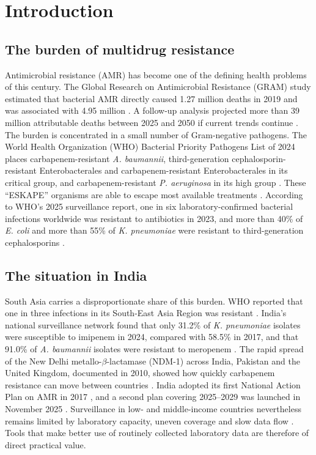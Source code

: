 \documentclass[11pt,a4paper]{article}
\newcommand{\sci}[1]{\textit{#1}}
\begin{document}
\clearpage

\section{Introduction}
\subsection{The burden of multidrug resistance}
Antimicrobial resistance (AMR) has become one of the defining health problems of this century. The Global Research on Antimicrobial Resistance (GRAM) study estimated that bacterial AMR directly caused 1.27 million deaths in 2019 and was associated with 4.95 million \cite{murray2022}. A follow-up analysis projected more than 39 million attributable deaths between 2025 and 2050 if current trends continue \cite{naghavi2024}. The burden is concentrated in a small number of Gram-negative pathogens. The World Health Organization (WHO) Bacterial Priority Pathogens List of 2024 places carbapenem-resistant \sci{A. baumannii}, third-generation cephalosporin-resistant Enterobacterales and carbapenem-resistant Enterobacterales in its critical group, and carbapenem-resistant \sci{P. aeruginosa} in its high group \cite{who_bppl2024}. These ``ESKAPE'' organisms are able to escape most available treatments \cite{rice2008}. According to WHO's 2025 surveillance report, one in six laboratory-confirmed bacterial infections worldwide was resistant to antibiotics in 2023, and more than 40\% of \sci{E. coli} and more than 55\% of \sci{K. pneumoniae} were resistant to third-generation cephalosporins \cite{who_glass2025}.

\subsection{The situation in India}
South Asia carries a disproportionate share of this burden. WHO reported that one in three infections in its South-East Asia Region was resistant \cite{who_glass2025}. India's national surveillance network found that only 31.2\% of \sci{K. pneumoniae} isolates were susceptible to imipenem in 2024, compared with 58.5\% in 2017, and that 91.0\% of \sci{A. baumannii} isolates were resistant to meropenem \cite{icmr2024}. The rapid spread of the New Delhi metallo-$\beta$-lactamase (NDM-1) across India, Pakistan and the United Kingdom, documented in 2010, showed how quickly carbapenem resistance can move between countries \cite{kumarasamy2010}. India adopted its first National Action Plan on AMR in 2017 \cite{napamr2017}, and a second plan covering 2025--2029 was launched in November 2025 \cite{napamr2025}. Surveillance in low- and middle-income countries nevertheless remains limited by laboratory capacity, uneven coverage and slow data flow \cite{gandra2020}. Tools that make better use of routinely collected laboratory data are therefore of direct practical value.
\end{document}
